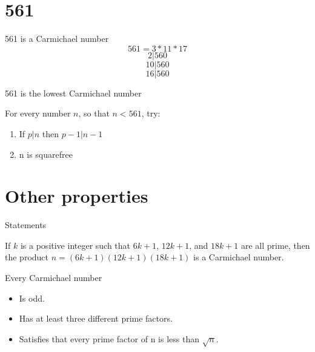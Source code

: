 \documentclass{beamer}
\begin{document}
\section{561}
\begin{frame}{561 is a Carmichael number}
$$561 = 3*11*17$$
$$2 |560$$
$$10 |560$$
$$16 |560$$
    
\end{frame}

\begin{frame}{561 is the lowest Carmichael number}
\begin{lemma}
For every number $n$, so that $n<561$, try:
    \begin{enumerate}
        \item If $p|n$ then $p-1|n-1$
        \item n is squarefree
    \end{enumerate}
    
\end{lemma}
\end{frame}










\section{Other properties}
\begin{frame}{Statements}
    \begin{corollary}
        If $k$ is a positive integer such that $6k + 1$, $12k + 1$, and $18k + 1$ are all prime,
then the product $n = (6k + 1)(12k + 1)(18k + 1)$ is a Carmichael number.
    \end{corollary}
    \pause\begin{lemma}
        Every Carmichael number
        \pause\begin{itemize}
            \item Is odd.
            \pause\item Has at least three different prime factors.
            \pause\item Satisfies that every prime factor of n is less than $\sqrt{n}$.
        \end{itemize}
    \end{lemma}
\end{frame}
\end{document}
